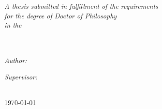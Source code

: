 \begin{titlepage}
\begin{center}
			\large \textit{A thesis submitted in fulfillment of the requirements\\ for the degree of Doctor of Philosophy}\\[0.5cm] %
			\textit{in the}\\[0.5cm]
			\myDepartment\\ \myFaculty\\[1cm]
			
			\begin{minipage}{.45\linewidth}
				\begin{flushleft} %
				\emph{Author:}\\
				\href{https://uk.linkedin.com/in/fabriziomiano}{\myName} %
				\end{flushleft}
			\end{minipage}
			\hfill
			\begin{minipage}{.45\linewidth}
				\begin{flushright} %
				\emph{Supervisor:} \\
				\href{http://www.sussex.ac.uk/profiles/168614}{\mySupervisor}%
				\end{flushright}
			\end{minipage}\\ [0.5cm]

			{\large \today}\\%
			 
			\vfill
		\end{center}

\end{titlepage}
